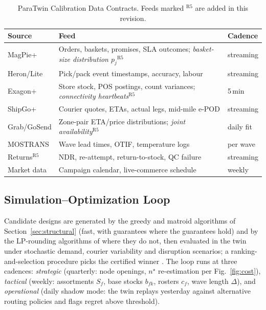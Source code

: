 \begin{table}[t]
\caption{ParaTwin Calibration Data Contracts. Feeds marked $^{\mathrm{R5}}$ are added in this revision.}
\label{tab:contracts}
\centering\footnotesize
\begin{tabular}{@{}p{1.5cm}p{4.4cm}p{1.4cm}@{}}
\toprule
\textbf{Source} & \textbf{Feed} & \textbf{Cadence}\\
\midrule
MagPie+ & Orders, baskets, promises, SLA outcomes; \emph{basket-size distribution $p_j$}$^{\mathrm{R5}}$ & streaming\\
Heron/Lite & Pick/pack event timestamps, accuracy, labour & streaming\\
Exagon+ & Store stock, POS postings, count variances; \emph{connectivity heartbeats}$^{\mathrm{R5}}$ & 5\,min\\
ShipGo+ & Courier quotes, ETAs, actual legs, mid-mile e-POD & streaming\\
Grab/GoSend & Zone-pair ETA/price distributions; \emph{joint availability}$^{\mathrm{R5}}$ & daily fit\\
MOSTRANS & Wave lead times, OTIF, temperature logs & per wave\\
Returns$^{\mathrm{R5}}$ & NDR, re-attempt, return-to-stock, QC failure & streaming\\
Market data & Campaign calendar, live-commerce schedule & weekly\\
\bottomrule
\end{tabular}
\end{table}

\subsection{Simulation--Optimization Loop}
Candidate designs are generated by the greedy and matroid algorithms of Section~\ref{sec:structural} (fast, with guarantees where the guarantees hold) and by the LP-rounding algorithms of \cite{chekuri2004,fleischer2011} where they do not, then evaluated in the twin under stochastic demand, courier variability and disruption scenarios; a ranking-and-selection procedure picks the certified winner \cite{snoeck2022,law2015}. The loop runs at three cadences: \emph{strategic} (quarterly: node openings, $n^\star$ re-estimation per Fig.~\ref{fig:cost}), \emph{tactical} (weekly: assortments $S_f$, base stocks $b_{fk}$, rosters $c_f$, wave length $\Delta$), and \emph{operational} (daily shadow mode: the twin replays yesterday against alternative routing policies and flags regret above threshold).

